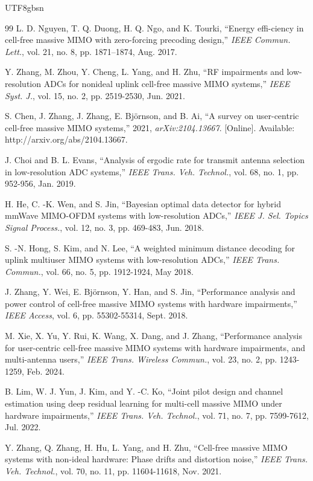 \documentclass[lettersize,journal]{IEEEtran}
\begin{document}
\begin{CJK}{UTF8}{gbsn}
\begin{thebibliography}{99}
L. D. Nguyen, T. Q. Duong, H. Q. Ngo, and K. Tourki, “Energy effi-ciency in cell-free massive MIMO with zero-forcing precoding design,” \textit{IEEE Commun. Lett.}, vol. 21, no. 8, pp. 1871–1874, Aug. 2017.

Y. Zhang, M. Zhou, Y. Cheng, L. Yang, and H. Zhu, “RF impairments and low-resolution ADCs for nonideal uplink cell-free massive MIMO systems,” \textit{IEEE Syst. J.}, vol. 15, no. 2, pp. 2519-2530, Jun. 2021.

S. Chen, J. Zhang, J. Zhang, E. Björnson, and B. Ai, “A survey on user-centric cell-free massive MIMO systems,” 2021, \textit{arXiv:2104.13667}. [Online]. Available: http://arxiv.org/abs/2104.13667.

J. Choi and B. L. Evans, “Analysis of ergodic rate for transmit antenna selection in low-resolution ADC systems,” \textit{IEEE Trans. Veh. Technol.}, vol. 68, no. 1, pp. 952-956, Jan. 2019.

H. He, C. -K. Wen, and S. Jin, “Bayesian optimal data detector for hybrid mmWave MIMO-OFDM systems with low-resolution ADCs,” \textit{IEEE J. Sel. Topics Signal Process.}, vol. 12, no. 3, pp. 469-483, Jun. 2018.

S. -N. Hong, S. Kim, and N. Lee, “A weighted minimum distance decoding for uplink multiuser MIMO systems with low-resolution ADCs,” \textit{IEEE Trans. Commun.}, vol. 66, no. 5, pp. 1912-1924, May 2018.

J. Zhang, Y. Wei, E. Björnson, Y. Han, and S. Jin, “Performance analysis and power control of cell-free massive MIMO systems with hardware impairments,” \textit{IEEE Access}, vol. 6, pp. 55302-55314, Sept. 2018.

M. Xie, X. Yu, Y. Rui, K. Wang, X. Dang, and J. Zhang, “Performance analysis for user-centric cell-free massive MIMO systems with hardware impairments, and multi-antenna users,” \textit{IEEE Trans. Wireless Commun.}, vol. 23, no. 2, pp. 1243-1259, Feb. 2024.

B. Lim, W. J. Yun, J. Kim, and Y. -C. Ko, “Joint pilot design and channel estimation using deep residual learning for multi-cell massive MIMO under hardware impairments,” \textit{IEEE Trans. Veh. Technol.}, vol. 71, no. 7, pp. 7599-7612, Jul. 2022.

Y. Zhang, Q. Zhang, H. Hu, L. Yang, and H. Zhu, “Cell-free massive MIMO systems with non-ideal hardware: Phase drifts and distortion noise,” \textit{IEEE Trans. Veh. Technol.}, vol. 70, no. 11, pp. 11604-11618, Nov. 2021.



\end{thebibliography}
\end{CJK}
\end{document}
